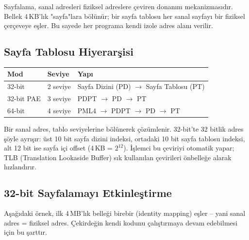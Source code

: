 \documentclass[11pt,a4paper]{article}
\begin{document}
Sayfalama, sanal adresleri fiziksel adreslere çeviren donanım mekanizmasıdır.
Bellek 4\,KB'lık "sayfa"lara bölünür; bir sayfa tablosu her sanal sayfayı bir
fiziksel çerçeveye eşler. Bu sayede her programa kendi izole adres alanı verilir.

\subsection{Sayfa Tablosu Hiyerarşisi}

\begin{center}
\begin{tabularx}{\textwidth}{@{}l l >{\raggedright\arraybackslash}X@{}}
\toprule
\rowcolor{anaMavi}\color{white}\textbf{Mod} & \color{white}\textbf{Seviye} & \color{white}\textbf{Yapı} \\
\midrule
32-bit & 2 seviye & Sayfa Dizini (PD) $\rightarrow$ Sayfa Tablosu (PT) \\
\rowcolor{acikGri} 32-bit PAE & 3 seviye & PDPT $\rightarrow$ PD $\rightarrow$ PT \\
64-bit & 4 seviye & PML4 $\rightarrow$ PDPT $\rightarrow$ PD $\rightarrow$ PT \\
\bottomrule
\end{tabularx}
\end{center}

\begin{bilgikutu}
Bir sanal adres, tablo seviyelerine bölünerek çözümlenir. 32-bit'te 32 bitlik
adres şöyle ayrışır: üst 10 bit sayfa dizini indeksi, ortadaki 10 bit sayfa
tablosu indeksi, alt 12 bit ise sayfa içi offset (4\,KB = $2^{12}$). İşlemci
bu çeviriyi otomatik yapar; TLB (Translation Lookaside Buffer) sık kullanılan
çevirileri önbelleğe alarak hızlandırır.
\end{bilgikutu}

\subsection{32-bit Sayfalamayı Etkinleştirme}

Aşağıdaki örnek, ilk 4\,MB'lık belleği birebir (identity mapping) eşler --
yani sanal adres = fiziksel adres. Çekirdeğin kendi kodunu çalıştırmaya devam
edebilmesi için bu şarttır.
\end{document}

